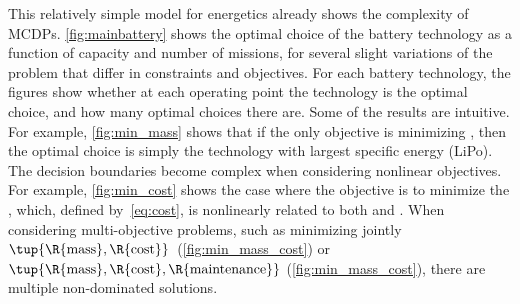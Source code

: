 This relatively simple model for energetics already shows the complexity
of MCDPs. \cref{fig:mainbattery} shows the optimal choice of the battery
technology as a function of capacity and number of missions, for several
slight variations of the problem that differ in constraints and objectives.
For each battery technology, the figures show whether at each operating
point the technology is the optimal choice, and how many optimal choices
there are. Some of the results are intuitive. For example, \cref{fig:min_mass}
shows that if the only objective is minimizing , then the
optimal choice is simply the technology with largest specific energy
(LiPo). The decision boundaries become complex when considering nonlinear
objectives. For example, \cref{fig:min_cost} shows the case where the
objective is to minimize the , which, defined by~\cref{eq:cost},
is nonlinearly related to both  and .
When considering multi-objective problems, such as minimizing jointly
$\tup{ \R{\text{mass}},\R{\text{cost}}} $~(\cref{fig:min_mass_cost})
or~$\tup{ \R{\text{mass}},\R{\text{cost}},\R{\text{maintenance}}} $
(\cref{fig:min_mass_cost}), there are multiple non-dominated solutions.

